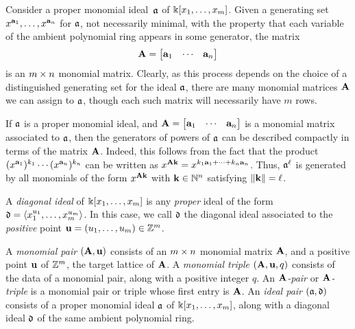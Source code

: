 \documentclass{amsart}
\begin{document}
\begin{remark}
   \label{monomial matrix ideal: R}
   Consider a proper monomial ideal~$\mathfrak{a}$ of $\Bbbk[x_1, \ldots, x_{m}]$.
   Given a generating set $x^{\mathbf{a}_1}, \ldots, x^{\mathbf{a}_n}$ for $\mathfrak{a}$, not necessarily minimal, with the property that each variable of the ambient polynomial ring appears in some generator, the matrix
   \[
      \mathbf{A}= \begin{bmatrix} \mathbf{a}_1 & \cdots & \mathbf{a}_n \end{bmatrix}
   \]
   is an  $m \times n$ monomial matrix.
   Clearly, as this process depends on the choice of a distinguished generating set for the ideal $\mathfrak{a}$, there are many monomial matrices $\mathbf{A}$ we can assign to $\mathfrak{a}$, though each such matrix will necessarily have $m$ rows.
\end{remark}

\begin{remark}
   \label{generators-via-exponent-matrix: R}
   If $\mathfrak{a}$ is a proper monomial ideal, and $\mathbf{A}= \begin{bmatrix} \mathbf{a}_1 & \cdots & \mathbf{a}_n \end{bmatrix}$ is a monomial matrix associated to $\mathfrak{a}$, then the generators of powers of $\mathfrak{a}$ can be described compactly in terms of the matrix $\mathbf{A}$.
   Indeed, this follows from the fact that the product $(x^{\mathbf{a}_1})^{k_1} \cdots (x^{\mathbf{a}_n})^{k_n}$ can be written as $x^{\mathbf{A} \mathbf{k}} = x^{k_1 \mathbf{a}_1 + \cdots + k_n \mathbf{a}_n}$.
   Thus, $\mathfrak{a}^\ell$ is generated by all monomials of the form $x^{\mathbf{A} \mathbf{k}}$ with $\mathbf{k} \in \mathbb{N}^n$ satisfying $\| \mathbf{k} \| = \ell$.
\end{remark}

\begin{definition}
   A  \emph{diagonal ideal} of $\Bbbk[x_1, \ldots, x_{m}]$ is any \emph{proper} ideal of the form $\mathfrak{d} = \langle x_1^{u_1}, \ldots, x_{m}^{u_{m}} \rangle$.
   In this case,  we call $\mathfrak{d}$ the diagonal ideal associated to the \emph{positive} point $\mathbf{u} = (u_1, \ldots, u_{m}) \in \mathbb{Z}^{m}$.
\end{definition}

\begin{definition}
\label{pairs: D}
A \emph{monomial pair} $(\mathbf{A}, \mathbf{u})$ consists of an $m \times n$ monomial matrix $\mathbf{A}$, and a positive point $\mathbf{u}$ of $\mathbb{Z}^m$, the target lattice of $\mathbf{A}$.
A \emph{monomial triple} $(\mathbf{A},\mathbf{u},q)$ consists of the data of a monomial pair, along with a positive integer $q$.
    An \emph{$\mathbf{A}$-pair} or \emph{$\mathbf{A}$-triple} is a monomial pair or triple whose first entry is $\mathbf{A}$.
   An \emph{ideal pair} $(\mathfrak{a}, \mathfrak{d})$ consists of a proper monomial ideal $\mathfrak{a}$ of $\Bbbk[x_1, \ldots, x_{m}]$, along with a diagonal ideal $\mathfrak{d}$ of the same ambient polynomial ring.
\end{definition}
\end{document}
